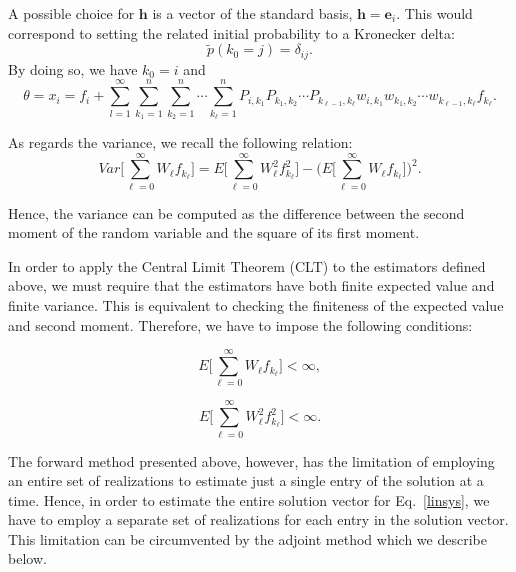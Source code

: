 \documentclass[times]{nlaauth}
\begin{document}
A possible choice for $\mathbf{h}$ is a vector of the standard basis,
$\mathbf{h} = \mathbf{e}_i$. This
would correspond to setting the related initial probability to a Kronecker
delta:
\[
\tilde{p}(k_0=j)=\delta_{ij}.
\]
By doing so, we have $k_0 = i$ and
\begin{equation}
\theta = x_i=
f_i + \sum_{l=1}^\infty
\sum_{k_1=1}^{n}\sum_{k_2=1}^n\cdots \sum_{k_{\ell}=1}^n
P_{i,k_1}P_{k_1,k_2}\cdots P_{k_{\ell-1},
k_{\ell}}w_{i,k_1}w_{k_1,k_2}\cdots
w_{k_{\ell-1}, k_{\ell}}f_{k_{\ell}}.
\label{dir_mean}
\end{equation}

As regards the variance, we recall the following relation:
\begin{equation}
Var\bigg [\sum_{\ell=0}^\infty W_{\ell}
f_{k_{\ell}}\bigg]=E\bigg[\sum_{\ell=0}^\infty W_{\ell}^2
f_{k_{\ell}}^2\bigg] - \bigg (E\bigg[\sum_{\ell=0}^\infty W_{\ell}
f_{k_{\ell}}\bigg]\bigg )^2.
\label{dir_var}
\end{equation}

Hence, the variance can be computed as the difference between the second
moment of the random variable and the square of its first moment.\newline

In order to apply the Central Limit Theorem (CLT) to the estimators defined
above, we must require that
the estimators have both finite expected value and finite variance. This is
equivalent to
checking the finiteness of the expected value and second moment.
Therefore, we have to impose the following conditions:

\begin{equation}
 E\bigg[\sum_{\ell=0}^\infty W_{\ell} f_{k_{\ell}}\bigg]<\infty,
\end{equation}

\begin{equation}
 E\bigg[\sum_{\ell=0}^\infty W_{\ell}^2
f_{k_{\ell}}^2\bigg]<\infty .
\end{equation}

The forward method presented above, however, has the limitation of employing an
entire set of realizations to estimate just a single entry of
the solution at a time. Hence, in order to estimate the entire solution
vector for Eq.~\eqref{linsys}, we have to employ a separate set of
realizations for each entry in the solution vector. This limitation
can be circumvented by the adjoint method which we describe below.
\end{document}

